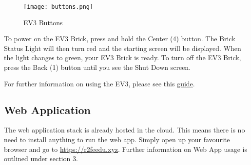     \begin{wrapfigure}{r}{0.25\textwidth}
        \centering
        \texttt{[image: buttons.png]}
         \caption{EV3 Buttons}
    \end{wrapfigure}
 
    
    To power on the EV3 Brick, press and hold the Center (4) button. The Brick Status Light will then turn red and the starting screen will be displayed. When the light changes to green, your EV3 Brick is ready. To turn off the EV3 Brick, press the Back (1) button until you see the Shut Down screen. 
    
    For further information on using the EV3, please see this \href{https://le-www-live-s.legocdn.com/sc/media/files/user-guides/ev3/ev3_user_guide_engb-f24950e6482a3c16e56af0fd72a756fe.pdf}{guide}.
    
    \subsection{Web Application}
    The web application stack is already hosted in the cloud. This means there is no need to install anything to run the web app. Simply open up your favourite browser and go to \url{https://r2feedu.xyz}. Further information on Web App usage is outlined under section 3. 




    
        